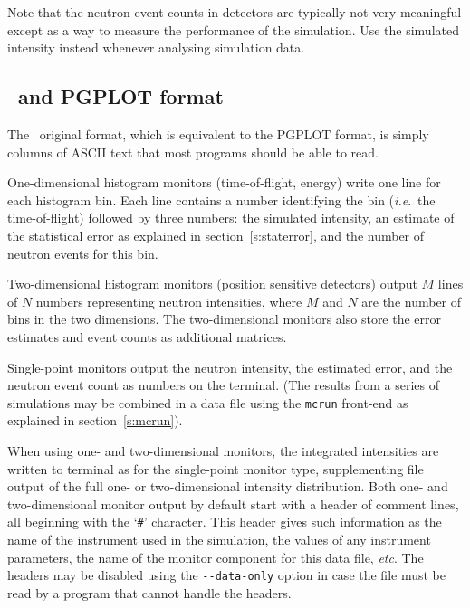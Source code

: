 Note that the neutron event counts in detectors are typically not very
meaningful except as a way to measure the performance of the
simulation. Use the simulated intensity instead whenever analysing
simulation data.

\subsection{\MCS\ and PGPLOT format}
  The \MCS\ original format, which is
equivalent to the PGPLOT format, is simply columns of ASCII text that most
programs should be able to read.

One-dimensional histogram monitors (time-of-flight, energy)
write one line for each histogram bin. Each line contains a number
identifying the bin (\textit{i.e}.\ the time-of-flight) followed by
three numbers: the simulated intensity, an estimate of the statistical
error as explained in section~\ref{s:staterror}, and the number of
neutron events for this bin.

Two-dimensional histogram monitors (position sensitive detectors) output $M$
lines of $N$ numbers representing neutron intensities, where $M$ and $N$ are the
number of bins in the two dimensions. The two-dimensional monitors also store
the error estimates and event counts as additional matrices.

Single-point monitors output the neutron intensity, the estimated
error, and the neutron event count as numbers on the
terminal. (The results from a series of simulations may be combined in a
data file using the \verb+mcrun+ front-end as explained in
section~\ref{s:mcrun}).

When using one- and two-dimensional monitors, the integrated intensities are
written to terminal as for the single-point monitor type, supplementing file
output of the full one- or two-dimensional intensity distribution. Both one- and
two-dimensional monitor output by default start with a header of comment lines,
all beginning with the `\verb+#+' character.  This header gives such information
as the name of the instrument used in the simulation, the values of any
instrument parameters, the name of the monitor component for this data file,
\textit{etc}. The headers may be disabled using the \verb+--data-only+ option in
case the file must be read by a program that cannot handle the headers.

